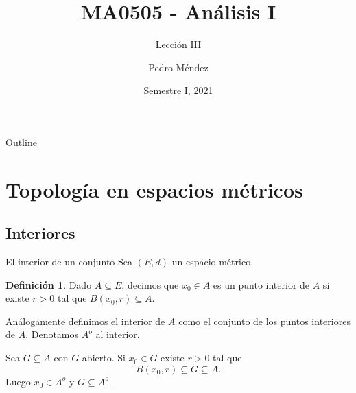 \documentclass[utf8]{beamer}
\title[MA0505]{MA0505 - An\'alisis I}
\subtitle{Lecci\'on III}
\author{Pedro M\'endez\inst{1}}
\institute[Universidad de Costa Rica] %
{
  \inst{1}%
  Departmento de Matem\'atica Pura y Ciencias Actuariales\\
  Universidad de Costa Rica
  }
\date[I-2021] {Semestre I, 2021}
\theoremstyle{plain}
\theoremstyle{definition}
\newtheorem{Def}{Definición}           %
\theoremstyle{remark}
\numberwithin{equation}{section}
\begin{document}
\begin{frame}
  \titlepage
\end{frame}

\begin{frame}{Outline}
  \tableofcontents
\end{frame}





\section{Topolog\'ia en espacios m\'etricos}

\subsection{Interiores}

\begin{frame}{El interior de un conjunto}%
Sea $(E,d)$ un espacio m\'etrico.
  \begin{Def}
    Dado $A\subseteq E$, decimos que $x_0\in A$ es un \alert{punto interior} de $A$ si existe $r>0$ tal que $B(x_0,r)\subseteq A$.\par
    Análogamente definimos el \alert{interior} de $A$ como el conjunto de los puntos interiores de $A$. Denotamos $A^o$ al interior.
  \end{Def}
  Sea $G\subseteq A$ con $G$ abierto. Si $x_0\in G$ existe $r>0$ tal que $$B(x_0,r)\subseteq G\subseteq A.$$ 
  Luego $x_0\in A^o$ y \alert{$G\subseteq A^o$}.
\end{frame}
\end{document}
